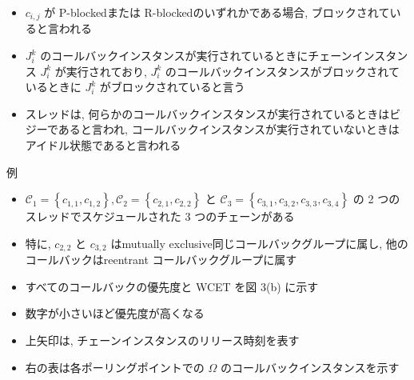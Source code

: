 \begin{frame}{}
    \begin{itemize}
        \item $c_{i, j}$ が P-blockedまたは R-blockedのいずれかである場合, ブロックされていると言われる
        \item $J_{i}^{k}$ のコールバックインスタンスが実行されているときにチェーンインスタンス $J_{i}^{k}$ が実行されており, $J_{i}^{k}$ のコールバックインスタンスがブロックされているときに $J_{i}^{k}$ がブロックされていると言う
        \item スレッドは, 何らかのコールバックインスタンスが実行されているときはビジーであると言われ, コールバックインスタンスが実行されていないときはアイドル状態であると言われる
    \end{itemize}
\end{frame}

\begin{frame}{例}
    \begin{itemize}
        \item $\mathcal{C}_{1}=\left\{c_{1,1}, c_{1,2}\right\}, \mathcal{C}_{2}=\left\{c_{2,1}, c_{2,2}\right\}$ と $\mathcal{C}_{3}=\left\{c_{3,1}, c_{3,2}, c_{3,3}, c_{3,4}\right\}$ の 2 つのスレッドでスケジュールされた 3 つのチェーンがある
        \item 特に, $c_{2,2}$ と $c_{3,2}$ はmutually exclusive同じコールバックグループに属し, 他のコールバックはreentrant コールバックグループに属す
        \item すべてのコールバックの優先度と WCET を図 3(b) に示す
        \item 数字が小さいほど優先度が高くなる

    \end{itemize}
    \centering
\end{frame}


\begin{frame}{}
    \begin{itemize}
        \item 上矢印は, チェーンインスタンスのリリース時刻を表す
        \item 右の表は各ポーリングポイントでの $\Omega$ のコールバックインスタンスを示す
    \end{itemize}
    \centering
\end{frame}

